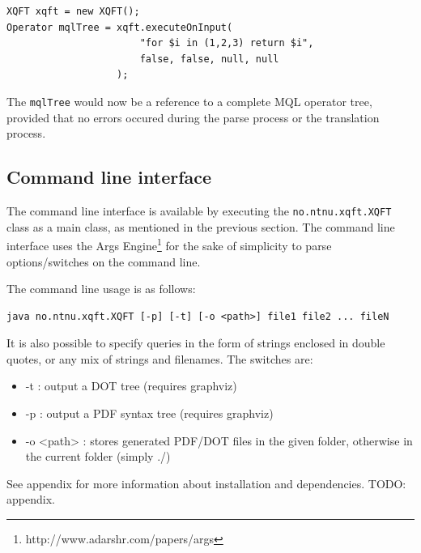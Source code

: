\begin{Verbatim}
XQFT xqft = new XQFT();
Operator mqlTree = xqft.executeOnInput(
                       "for $i in (1,2,3) return $i", 
                       false, false, null, null
                   );
\end{Verbatim}

The \texttt{mqlTree} would now be a reference to a complete MQL operator tree,
provided that no errors occured during the parse process or the translation
process.

\subsection{Command line interface}
The command line interface is available by executing the
\texttt{no.ntnu.xqft.XQFT} class as a main class, as mentioned in the previous
section. The command line interface uses the Args
Engine\footnote{http://www.adarshr.com/papers/args} for the sake of simplicity
to parse options/switches on the command line. 

The command line usage is as follows:

\begin{Verbatim}
java no.ntnu.xqft.XQFT [-p] [-t] [-o <path>] file1 file2 ... fileN
\end{Verbatim}

It is also possible to specify queries in the form of strings enclosed in
double quotes, or any mix of strings and filenames. The switches are:
\begin{itemize}
  \item -t : output a DOT tree (requires graphviz)
  \item -p : output a PDF syntax tree (requires graphviz)
  \item -o <path> : stores generated PDF/DOT files in the given folder, 
  otherwise in the current folder (simply ./)
\end{itemize}

See appendix for more information about installation and dependencies.
TODO: appendix.